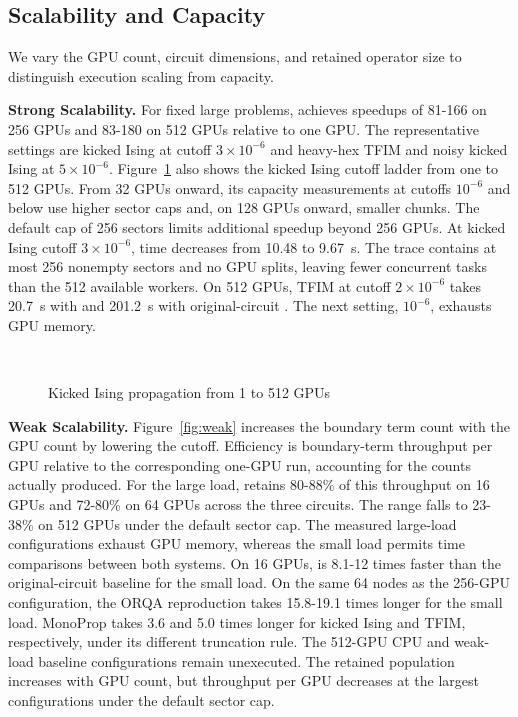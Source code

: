 \subsection{Scalability and Capacity}
We vary the GPU count, circuit dimensions, and retained operator size to distinguish execution scaling from capacity.

\noindent\textbf{Strong Scalability.}
For fixed large problems, \SectorQ achieves speedups of 81-166 on 256 GPUs and 83-180 on 512 GPUs relative to one GPU.
The representative settings are kicked Ising at cutoff $3\times10^{-6}$ and heavy-hex TFIM and noisy kicked Ising at $5\times10^{-6}$.
Figure~\ref{fig:scaleout} also shows the kicked Ising cutoff ladder from one to 512 GPUs.
From 32 GPUs onward, its capacity measurements at cutoffs $10^{-6}$ and below use higher sector caps and, on 128 GPUs onward, smaller chunks.
The default cap of 256 sectors limits additional speedup beyond 256 GPUs.
At kicked Ising cutoff $3\times10^{-6}$, time decreases from 10.48 to 9.67~s.
The trace contains at most 256 nonempty sectors and no GPU splits, leaving fewer concurrent tasks than the 512 available workers.
On 512 GPUs, TFIM at cutoff $2\times10^{-6}$ takes 20.7~s with \SectorQ and 201.2~s with original-circuit \cuPP.
The next \cuPP setting, $10^{-6}$, exhausts GPU memory.

\begin{figure}[t]
\centering
{}\\[-2pt]
\caption{Kicked Ising propagation from 1 to 512 GPUs}
\label{fig:scaleout}
\end{figure}

\noindent\textbf{Weak Scalability.}
Figure~\ref{fig:weak} increases the boundary term count with the GPU count by lowering the cutoff.
Efficiency is boundary-term throughput per GPU relative to the corresponding one-GPU run, accounting for the counts actually produced.
For the large load, \SectorQ retains 80-88\% of this throughput on 16 GPUs and 72-80\% on 64 GPUs across the three circuits.
The range falls to 23-38\% on 512 GPUs under the default sector cap.
The measured large-load \cuPP configurations exhaust GPU memory, whereas the small load permits time comparisons between both systems.
On 16 GPUs, \SectorQ is 8.1-12 times faster than the original-circuit baseline for the small load.
On the same 64 nodes as the 256-GPU configuration, the ORQA reproduction takes 15.8-19.1 times longer for the small load.
MonoProp takes 3.6 and 5.0 times longer for kicked Ising and TFIM, respectively, under its different truncation rule.
The 512-GPU CPU and weak-load baseline configurations remain unexecuted.
The retained population increases with GPU count, but throughput per GPU decreases at the largest configurations under the default sector cap.

